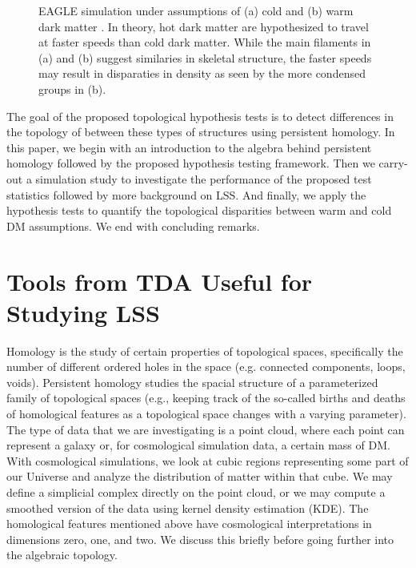 \documentclass[12pt]{article}
\begin{document}
\begin{figure}[htp!]
\begin{subfigure}{.3\textwidth}
    \label{fig:introDataWDM}
  \end{subfigure}
    \caption{EAGLE simulation under assumptions of (a) cold and (b) warm dark matter \citep{schaye2015eagle}. In theory, hot dark matter are hypothesized to travel at faster speeds than cold dark matter. While the main filaments in (a) and (b) suggest similaries in skeletal structure, the faster speeds may result in disparaties in density as seen by the more condensed groups in (b).}
    \label{fig:introData}
\end{figure}

The goal of the proposed topological hypothesis tests is to detect differences in the topology of between these types of structures using persistent homology. In this paper, we begin with an introduction to the algebra behind persistent homology followed by the proposed hypothesis testing framework. Then we carry-out a simulation study to investigate the performance of the proposed test statistics followed by more background on LSS. And finally, we apply the hypothesis tests to quantify the topological disparities between warm and cold DM assumptions. We end with concluding remarks.



\section{Tools from TDA Useful for Studying LSS}
\label{sec:tda}
Homology is the study of certain properties of topological spaces, specifically the number of different ordered holes in the space (e.g. connected components, loops, voids). Persistent homology studies the spacial structure of a parameterized family of topological spaces (e.g., keeping track of the so-called
births and deaths of homological features as a topological space changes with a varying parameter).
%
The type of data that we are investigating is a point cloud, where each point can represent a galaxy or, for cosmological simulation data, a certain mass of DM.
With cosmological simulations,  we look at cubic regions representing some part of our Universe and analyze
the distribution of matter within that cube. We may define a simplicial complex directly on the point cloud, or we may compute a smoothed version of the data using kernel density estimation (KDE). The homological features mentioned above have cosmological interpretations in dimensions zero, one, and two. We discuss this briefly before going further into the algebraic topology.
\end{document}
